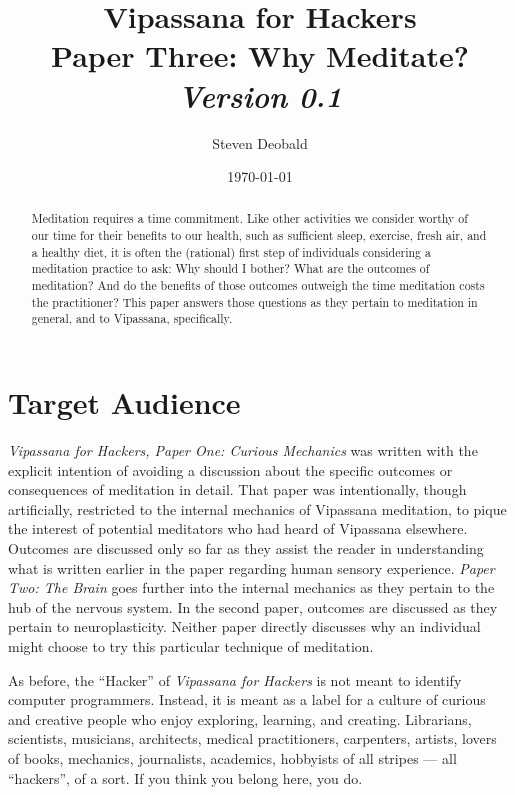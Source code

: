 \documentclass[a4paper, amsfonts, amssymb, amsmath, reprint, showkeys, nofootinbib, twoside]{revtex4-1}
\begin{document}
\title{%
  \large{Vipassana for Hackers} \\
  \Huge{Paper Three: Why Meditate?} \\
  \large\textit{Version 0.1}
}
\author{Steven Deobald}
\date{\today}

\begin{abstract}
 Meditation requires a time commitment. Like other activities we consider
 worthy of our time for their benefits to our health, such as sufficient sleep, exercise, fresh air, and a
 healthy diet, it is often the (rational) first step of individuals considering a
 meditation practice to ask: Why should I bother? What are the outcomes of
 meditation? And do the benefits of those outcomes outweigh the time meditation
 costs the practitioner? This paper answers those questions as they pertain to
 meditation in general, and to Vipassana, specifically.
\end{abstract}


\maketitle


\section{Target Audience}

\textit{Vipassana for Hackers, Paper One: Curious Mechanics} was written with the
explicit intention of avoiding a discussion about the specific
outcomes or consequences of meditation in detail. That paper was intentionally,
though artificially, restricted to
the internal mechanics of Vipassana meditation, to pique the interest of potential
meditators who had heard of Vipassana elsewhere. Outcomes are discussed only so far
as they assist the reader in understanding what is written earlier in the paper
regarding human sensory experience. \textit{Paper Two: The Brain} goes further into the internal
mechanics as they pertain to the
hub of the nervous system. In the second paper, outcomes are discussed as they pertain to
neuroplasticity. Neither paper directly discusses why an individual might choose to
try this particular technique of meditation.

As before, the ``Hacker'' of \textit{Vipassana for Hackers} is not meant to identify
computer programmers. Instead, it is meant as a label for a culture of curious and
creative people who enjoy exploring, learning, and creating. Librarians, scientists,
musicians, architects, medical practitioners, carpenters, artists, lovers of books,
mechanics, journalists, academics,
hobbyists of all stripes --- all ``hackers'', of a sort. If you think you belong
here, you do.
\end{document}
